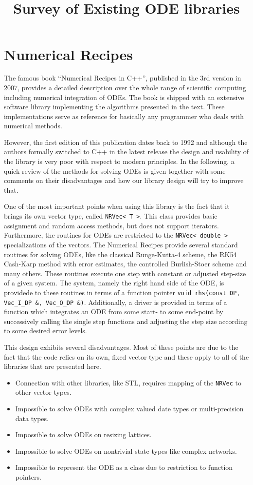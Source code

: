 \documentclass[a4paper,10pt]{article}
\title{Survey of Existing ODE libraries}
\begin{document}
 \maketitle

\section{Numerical Recipes}
The famous book ``Numerical Recipes in C++'', published in the 3rd version in 2007, provides a detailed description over the whole range of scientific computing including numerical integration of ODEs.
The book is shipped with an extensive software library implementing the algorithms presented in the text.
These implementations serve as reference for basically any programmer who deals with numerical methods.

However, the first edition of this publication dates back to 1992 and although the authors formally switched to C++ in the latest release the design and usability of the library is very poor with respect to modern principles.
In the following, a quick review of the methods for solving ODEs is given together with some comments on their disadvantages and how our library design will try to improve that.

One of the most important points when using this library is the fact that it brings its own vector type, called \lstinline+NRVec< T >+.
This class provides basic assignment and random access methods, but does not support iterators.
Furthermore, the routines for ODEs are restricted to the \lstinline+NRVec< double >+ specializations of the vectors.
The Numerical Recipes provide several standard routines for solving ODEs, like the classical Runge-Kutta-4 scheme, the RK54 Cash-Karp method with error estimates, the controlled Burlish-Stoer scheme and many others.
These routines execute one step with constant or adjusted step-size of a given system.
The system, namely the right hand side of the ODE, is providede to these routines in terms of a function pointer \lstinline+void rhs(const DP, Vec_I_DP &, Vec_O_DP &)+.
Additionally, a driver is provided in terms of a function which integrates an ODE from some start- to some end-point by successively calling the single step functions and adjusting the step size according to some desired error levels.

This design exhibits several disadvantages.
Most of these points are due to the fact that the code relies on its own, fixed vector type and these apply to all of the libraries that are presented here.
\begin{itemize}
 \item Connection with other libraries, like STL, requires mapping of the \lstinline+NRVec+ to other vector types.
 \item Impossible to solve ODEs with complex valued date types or multi-precision data types.
 \item Impossible to solve ODEs on resizing lattices.
 \item Impossible to solve ODEs on nontrivial state types like complex networks.
 \item Impossible to represent the ODE as a class due to restriction to function pointers.
\end{itemize}
\end{document}
